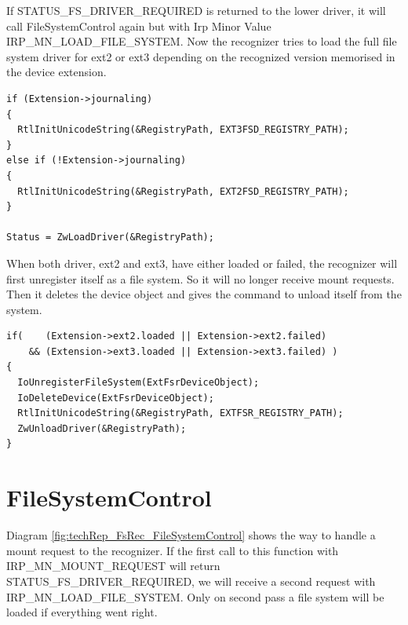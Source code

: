 If STATUS\_\-FS\_\-DRIVER\_\-REQUIRED is returned to the lower driver, it will call FileSystemControl again but with Irp Minor Value IRP\_\-MN\_\-LOAD\_\-FILE\_\-SYSTEM. Now the recognizer tries to load the full file system driver for ext2 or ext3 depending on the recognized version memorised in the device extension.

\begin{Verbatim}
if (Extension->journaling)
{
  RtlInitUnicodeString(&RegistryPath, EXT3FSD_REGISTRY_PATH);
}
else if (!Extension->journaling)
{
  RtlInitUnicodeString(&RegistryPath, EXT2FSD_REGISTRY_PATH);
}

Status = ZwLoadDriver(&RegistryPath);
\end{Verbatim}

When both driver, ext2 and ext3, have either loaded or failed, the recognizer will first unregister itself as a file system. So it will no longer receive mount requests. Then it deletes the device object and gives the command to unload itself from the system.

\begin{Verbatim}
if(    (Extension->ext2.loaded || Extension->ext2.failed)
    && (Extension->ext3.loaded || Extension->ext3.failed) )
{
  IoUnregisterFileSystem(ExtFsrDeviceObject);
  IoDeleteDevice(ExtFsrDeviceObject);
  RtlInitUnicodeString(&RegistryPath, EXTFSR_REGISTRY_PATH);
  ZwUnloadDriver(&RegistryPath);
}
\end{Verbatim}

\section{FileSystemControl}
Diagram \ref{fig:techRep_FsRec_FileSystemControl} shows the way to handle a mount request to the recognizer. If the first call to this function with IRP\_\-MN\_\-MOUNT\_\-REQUEST will return STATUS\_\-FS\_\-DRIVER\_\-REQUIRED, we will receive a second request with IRP\_\-MN\_\-LOAD\_\-FILE\_\-SYSTEM. Only on second pass a file system will be loaded if everything went right.
\clearpage

